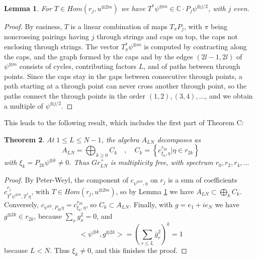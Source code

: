 \documentclass[11pt]{article}
\theoremstyle{plain}
\newtheorem{theorem}{Theorem}[section]
\newtheorem{lemma}[theorem]{Lemma}
\begin{document}
\begin{lemma}
\label{lem:paths}
For $T\in Hom(r_j,u^{\otimes 2m})$ we have $T^*\psi^{\otimes m}\in\mathbb C\cdot P_j\psi^{\otimes j/2}$, with $j$ even.
\end{lemma}

\begin{proof}
By easiness, $T$ is a linear combination of maps $T_\pi P_j$, with $\pi$ being noncrossing pairings having $j$ through strings and caps on top, the caps not enclosing through strings. The vector $T_\pi^*\psi^{\otimes m}$ is computed by contracting along the caps, and the graph formed by the caps and by the edges $(2l-1,2l)$ of $\psi^{\otimes m}$ consists of cycles, contributing factors $L$, and of paths between through points. Since the caps stay in the gaps between consecutive through points, a path starting at a through point can never cross another through point, so the paths connect the through points in the order $(1,2),(3,4),\ldots$, and we obtain a multiple of $\psi^{\otimes j/2}$.
\end{proof}

This leads to the following result, which includes the first part of Theorem C:

\begin{theorem}
\label{thm:spectrum}
At $1\leq L\leq N-1$, the algebra $A_{LN}$ decomposes as
$$A_{LN}=\bigoplus_{k\geq0}C_k\quad,\quad C_k=\left\{c^{r_{2k}}_{\xi_k,\eta}\Big|\eta\in r_{2k}\right\}$$
with $\xi_k=P_{2k}\psi^{\otimes k}\neq0$. Thus $Gr^+_{LN}$ is multiplicity free, with spectrum $r_0,r_2,r_4,\ldots$
\end{theorem}

\begin{proof}
By Peter-Weyl, the component of $c_{\psi^{\otimes m},\eta}$ on $r_j$ is a sum of coefficients $c^{r_j}_{T^*\psi^{\otimes m},T^*\eta}$, with $T\in Hom(r_j,u^{\otimes2m})$, so by Lemma \ref{lem:paths} we have $A_{LN}\subset\bigoplus_kC_k$. Conversely, $c_{\psi^{\otimes k},P_{2k}\eta}=c^{r_{2k}}_{\xi_k,\eta}$, so $C_k\subset A_{LN}$. Finally, with $g=e_1+ie_N$ we have $g^{\otimes2k}\in r_{2k}$, because $\sum_xg_x^2=0$, and
$$<\psi^{\otimes k},g^{\otimes 2k}>=\left(\sum_{r\leq L}\bar{g}_r^2\right)^k=1$$
because $L<N$. Thus $\xi_k\neq0$, and this finishes the proof.
\end{proof}
\end{document}
